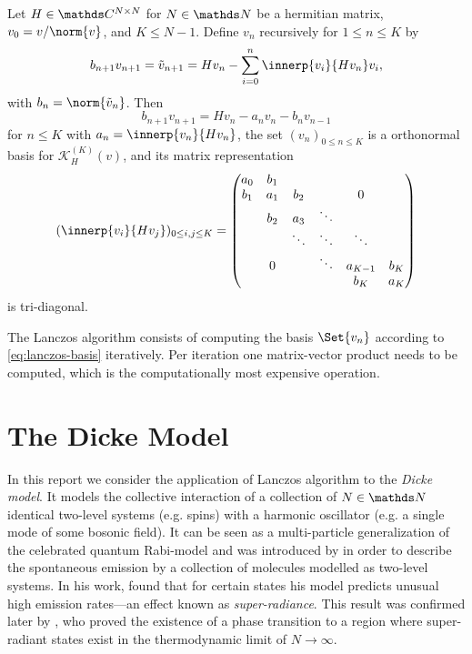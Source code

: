 \begin{lemma}\label{thm:lanczos-ONB}
    Let \(H\in \C^{N\times N}\) for \(N\in\N\) be a hermitian matrix, \(v_0 = v / \norm{v}\), and \(K \leq N-1\).
    Define \(v_n\) recursively for \(1 \leq n \leq K\) by
    \begin{equation}\label{eq:lanczos-basis-def}
        b_{n+1}v_{n+1} = \tilde v_{n+1} = H v_n - \sum_{i=0}^n \innerp{v_i}{H v_n} v_i
        ,
    \end{equation}
    with \(b_n = \norm{\tilde v_n}\).
    Then
    \begin{equation}\label{eq:lanczos-basis}
        b_{n+1} v_{n+1} = H v_n - a_n v_n - b_n v_{n-1}
    \end{equation}
    for \(n\leq K\) with \(a_n = \innerp{v_n}{H v_n}\),
    the set \((v_n)_{0\leq n \leq K}\) is a orthonormal basis for \(\mathcal{K}^{(K)}_H(v)\), and its matrix representation
    \begin{equation}
        (\innerp{v_i}{H v_j})_{0 \leq i,j \leq K} = 
        \begin{pmatrix}
            a_0 & b_1 &        &        &         &    \\
            b_1 & a_1 & b_2    &        &   0     &    \\
                & b_2 & a_3    & \ddots &         &    \\
                &     & \ddots & \ddots & \ddots  &    \\
                & 0   &        & \ddots & a_{K-1} & b_K\\
                &     &        &        & b_K     & a_{K}
        \end{pmatrix}
    \end{equation}
    is tri-diagonal.
\end{lemma}

The Lanczos algorithm consists of computing the basis \(\Set{v_n}\) according to \cref{eq:lanczos-basis} iteratively. 
Per iteration one matrix-vector product needs to be computed, which is the computationally most expensive operation.

\section{The Dicke Model}
In this report we consider the application of Lanczos algorithm to the \emph{Dicke model}.
It models the collective interaction of a collection of \(N\in\N\) identical two-level systems (e.g. spins) with a harmonic oscillator (e.g. a single mode of some bosonic field).
It can be seen as a multi-particle generalization of the celebrated quantum Rabi-model \cite{rabiSpaceQuantizationGyrating1937} and was introduced by \textcite{dickeCoherenceSpontaneousRadiation1954} in order to describe the spontaneous emission by a collection of molecules modelled as two-level systems.
In his work, \citeauthor{dickeCoherenceSpontaneousRadiation1954} found that for certain states his model predicts unusual high emission rates---an effect known as \emph{super-radiance}.
This result was confirmed later by \textcite{heppSuperradiantPhaseTransition1973}, who proved the existence of a phase transition to a region where super-radiant states exist in the thermodynamic limit of \(N\to\infty\).


